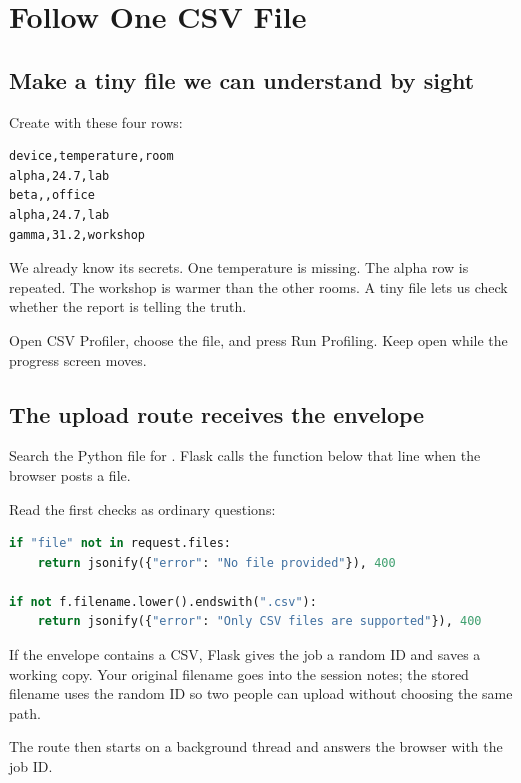 \chapter{Follow One CSV File}

\section{Make a tiny file we can understand by sight}

Create  with these four rows:

\begin{lstlisting}[numbers=none]
device,temperature,room
alpha,24.7,lab
beta,,office
alpha,24.7,lab
gamma,31.2,workshop
\end{lstlisting}

We already know its secrets. One temperature is missing. The alpha row is repeated. The workshop is warmer than the other rooms. A tiny file lets us check whether the report is telling the truth.

Open CSV Profiler, choose the file, and press Run Profiling. Keep  open while the progress screen moves.

\section{The upload route receives the envelope}

Search the Python file for . Flask calls the function below that line when the browser posts a file.

Read the first checks as ordinary questions:

\begin{lstlisting}[language=Python]
if "file" not in request.files:
    return jsonify({"error": "No file provided"}), 400

if not f.filename.lower().endswith(".csv"):
    return jsonify({"error": "Only CSV files are supported"}), 400
\end{lstlisting}

If the envelope contains a CSV, Flask gives the job a random ID and saves a working copy. Your original filename goes into the session notes; the stored filename uses the random ID so two people can upload  without choosing the same path.

The route then starts  on a background thread and answers the browser with the job ID.

